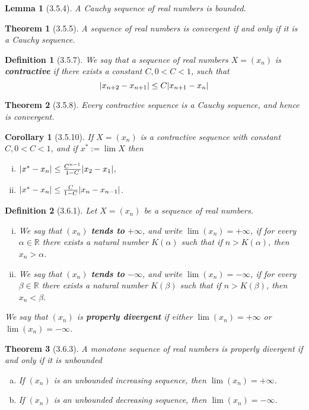 \documentclass{article}
\newtheorem*{corollary}{Corollary}
\newtheorem*{theorem}{Theorem}
\newtheorem*{definition}{Definition}
\newtheorem*{lemma}{Lemma}
\DeclarePairedDelimiter\abs{\lvert}{\rvert}%
\begin{document}
\begin{lemma}[3.5.4] A Cauchy sequence of real numbers is bounded.
\end{lemma}

\begin{theorem}[3.5.5] A sequence of real numbers is convergent if and only if it is a Cauchy sequence.
\end{theorem}

\begin{definition}[3.5.7] We say that a sequence of real numbers $X=(x_n)$ is \textbf{contractive}
  if there exists a constant $C, 0<C<1$, such that 
  $$\abs{x_{n+2}-x_{n+1}} \le C\abs{x_{n+1}-x_n}$$
\end{definition}

\begin{theorem}[3.5.8] Every contractive sequence is a Cauchy sequence, and hence is convergent.
\end{theorem}

\begin{corollary}[3.5.10] If $X=(x_n)$ is a contractive sequence with constant $C, 0<C<1$,
  and if $x^*:=\lim{X}$ then 
  \begin{enumerate}[(i)]
    \item $\abs{x^*-x_n} \le \frac{C^{n-1}}{1-C} \abs{x_2-x_1}$,
    \item $\abs{x^*-x_n} \le \frac{C}{1-C} \abs{x_n-x_{n-1}}$.
  \end{enumerate}
\end{corollary}

\begin{definition}[3.6.1] Let $X=(x_n)$ be a sequence of real numbers.
  \begin{enumerate}[(i)]
    \item We say that $(x_n)$ \textbf{tends to} $+\infty$, and write $\lim(x_n)=+\infty$, if
      for every $\alpha \in{\mathbb{R}}$ there exists a natural number $K(\alpha)$ such that 
      if $n>K(\alpha)$, then $x_n>\alpha$.
    \item We say that $(x_n)$ \textbf{tends to} $-\infty$, and write $\lim(x_n)=-\infty$, if
      for every $\beta \in{\mathbb{R}}$ there exists a natural number $K(\beta)$ such that 
      if $n>K(\beta)$, then $x_n<\beta$.
  \end{enumerate}
  We say that $(x_n)$ is \textbf{properly divergent} if either $\lim(x_n)=+\infty$ or
  $\lim(x_n)=-\infty$.
\end{definition}

\begin{theorem}[3.6.3] A monotone sequence of real numbers is properly divergent if and only if 
  it is unbounded
  \begin{enumerate}[(a)]
    \item If $(x_n)$ is an unbounded increasing sequence, then $\lim(x_n)=+\infty$.
    \item If $(x_n)$ is an unbounded decreasing sequence, then $\lim(x_n)=-\infty$.
  \end{enumerate}
\end{theorem}
\end{document}
